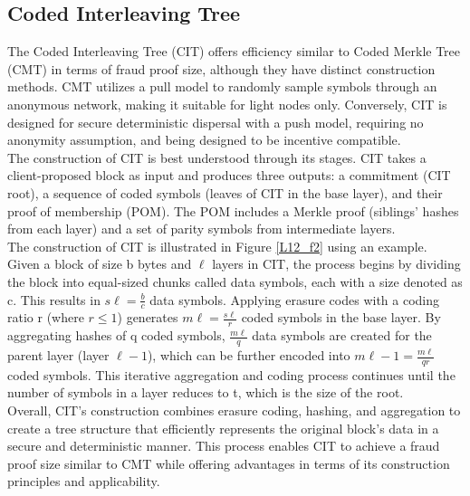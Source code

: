 \subsection{Coded Interleaving Tree}
The Coded Interleaving Tree (CIT) offers efficiency similar to Coded Merkle Tree (CMT) in terms of fraud proof size, although they have distinct construction methods. CMT utilizes a pull model to randomly sample symbols through an anonymous network, making it suitable for light nodes only. Conversely, CIT is designed for secure deterministic dispersal with a push model, requiring no anonymity assumption, and being designed to be incentive compatible.\\
The construction of CIT is best understood through its stages. CIT takes a client-proposed block as input and produces three outputs: a commitment (CIT root), a sequence of coded symbols (leaves of CIT in the base layer), and their proof of membership (POM). The POM includes a Merkle proof (siblings' hashes from each layer) and a set of parity symbols from intermediate layers.\\
The construction of CIT is illustrated in Figure \ref{L12_f2} using an example. Given a block of size b bytes and $\ell$ layers in CIT, the process begins by dividing the block into equal-sized chunks called data symbols, each with a size denoted as c. This results in $s\ell = \frac{b}{c}$ data symbols. Applying erasure codes with a coding ratio r (where $r \leq 1$) generates $m\ell = \frac{s\ell}{r}$ coded symbols in the base layer. By aggregating hashes of q coded symbols, $\frac{m\ell}{q}$ data symbols are created for the parent layer (layer $\ell - 1$), which can be further encoded into $m\ell - 1 = \frac{m\ell}{qr}$ coded symbols. This iterative aggregation and coding process continues until the number of symbols in a layer reduces to t, which is the size of the root.\\
Overall, CIT's construction combines erasure coding, hashing, and aggregation to create a tree structure that efficiently represents the original block's data in a secure and deterministic manner. This process enables CIT to achieve a fraud proof size similar to CMT while offering advantages in terms of its construction principles and applicability.
